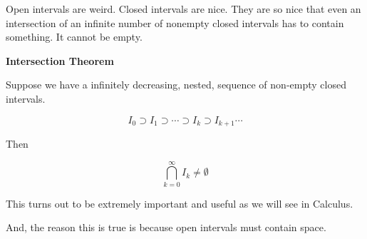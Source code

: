 \documentclass{ximera}
\begin{document}
Open intervals are weird.  Closed intervals are nice.  They are so nice that even an intersection of an infinite number of nonempty closed intervals has to contain something.  It cannot be empty.




\begin{theorem} \textbf{\textcolor{blue!75!black}{Intersection Theorem}}  


Suppose we have a infinitely decreasing, nested, sequence of non-empty closed intervals.


\[   I_0 \supset    I_1 \supset  \cdots \supset I_{k}   \supset I_{k+1}  \cdots  \]



Then 


\[   \bigcap_{k=0}^{\infty} I_{k} \ne \emptyset         \]


\end{theorem}













This turns out to be extremely important and useful as we will see in Calculus.


And, the reason this is true is because open intervals must contain space.
\end{document}
